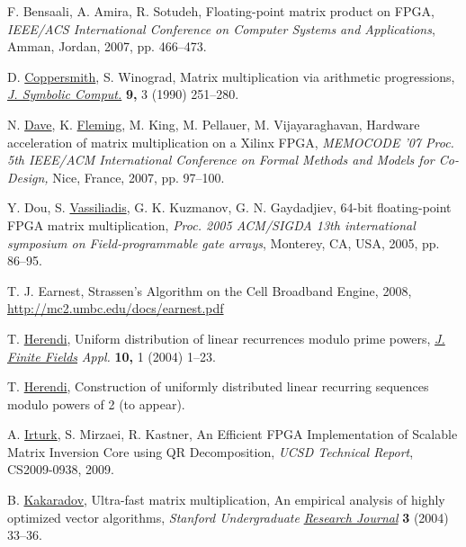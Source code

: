 \documentclass[11pt,twoside]{article}
\begin{document}
\begin{thebibliography}{99}


 F. Bensaali, A. Amira, R. Sotudeh, Floating-point matrix product on FPGA, \emph{IEEE/ACS International Conference on Computer Systems and Applications}, Amman, Jordan, 2007, pp. 466--473.

 D. \href{http://www.arnetminer.org/viewperson.do?naid=1131379&name=D.\%2520Coppersmith}{Coppersmith}, S. Winograd, Matrix multiplication via arithmetic progressions, \href{http://www.elsevier.com/wps/find/journaldescription.cws_home/622902/description}{\textit{J. Symbolic Comput.}} \textbf{9,} 3 (1990) 251--280.

 N. \href{http://arnetminer.org/viewperson.do?naid=1089695}{Dave}, K. \href{http://arnetminer.org/viewperson.do?naid=1407331}{Fleming}, M. King, M. Pellauer, M. Vijayaraghavan, Hardware acceleration of matrix multiplication on a Xilinx FPGA, \emph{MEMOCODE '07 Proc. 5th IEEE/ACM International Conference on Formal Methods and Models for Co-Design,} Nice, France, 2007, pp. 97--100.

\newpage
{} Y. Dou, S. \href{http://ce.et.tudelft.nl/person.php?id=2}{Vassiliadis}, G. K. Kuzmanov, G. N. Gaydadjiev, 64-bit floating-point FPGA matrix multiplication, \emph{Proc.  2005 ACM/SIGDA 13th international symposium on Field-programmable gate arrays}, Monterey, CA, USA, 2005, pp. 86--95.

 T. J. Earnest, Strassen's Algorithm on the Cell Broadband Engine, 2008,  \href{http://mc2.umbc.edu/docs/earnest.pdf}{http://mc2.umbc.edu/docs/earnest.pdf}

 T. \href{http://www.inf.unideb.hu/~herendi/}{Herendi}, Uniform distribution of linear recurrences modulo prime powers, \href{http://www.elsevier.com/wps/find/journaldescription.cws_home/622831/description}{\textit{J. Finite Fields}} \emph{Appl.} \textbf{10,} 1 (2004) 1--23.

 T. \href{http://www.inf.unideb.hu/~herendi/}{Herendi}, Construction of uniformly distributed linear recurring sequences modulo powers of  2 (to appear).

 A. \href{http://ucsd.academia.edu/AliIrturk/About}{Irturk}, S. Mirzaei, R. Kastner, An Efficient FPGA Implementation of Scalable Matrix Inversion Core using QR Decomposition, \emph{UCSD Technical Report}, CS2009-0938, 2009.

 B. \href{http://cs.stanford.edu/people/boyko/}{Kakaradov}, Ultra-fast matrix multiplication, An empirical analysis of highly optimized vector algorithms, \emph{Stanford Undergraduate} \href{http://surj.stanford.edu/2004/pdfs/kakaradov.pdf}{\textit{Research Journal}} \textbf{3} (2004) 33--36.


\end{thebibliography}
\end{document}
